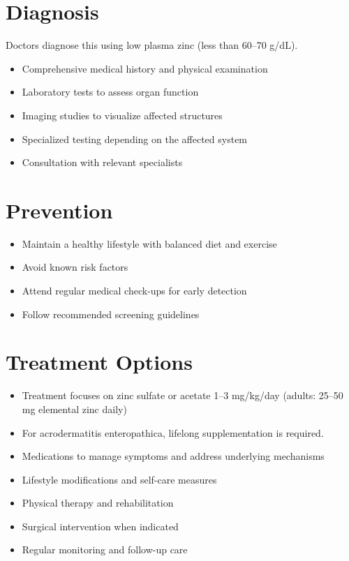 \section{Diagnosis}
Doctors diagnose this using low plasma zinc (less than 60--70 \textmu g/dL).

\begin{itemize}[noitemsep]
  \item Comprehensive medical history and physical examination
  \item Laboratory tests to assess organ function
  \item Imaging studies to visualize affected structures
  \item Specialized testing depending on the affected system
  \item Consultation with relevant specialists
\end{itemize}
\section{Prevention}
\begin{itemize}[noitemsep]
  \item Maintain a healthy lifestyle with balanced diet and exercise
  \item Avoid known risk factors
  \item Attend regular medical check-ups for early detection
  \item Follow recommended screening guidelines
\end{itemize}
\section{Treatment Options}
\begin{itemize}[noitemsep]
  \item Treatment focuses on zinc sulfate or acetate 1--3 mg/kg/day (adults: 25--50 mg elemental zinc daily)
  \item For acrodermatitis enteropathica, lifelong supplementation is required.
  \item Medications to manage symptoms and address underlying mechanisms
  \item Lifestyle modifications and self-care measures
  \item Physical therapy and rehabilitation
  \item Surgical intervention when indicated
  \item Regular monitoring and follow-up care
\end{itemize}
